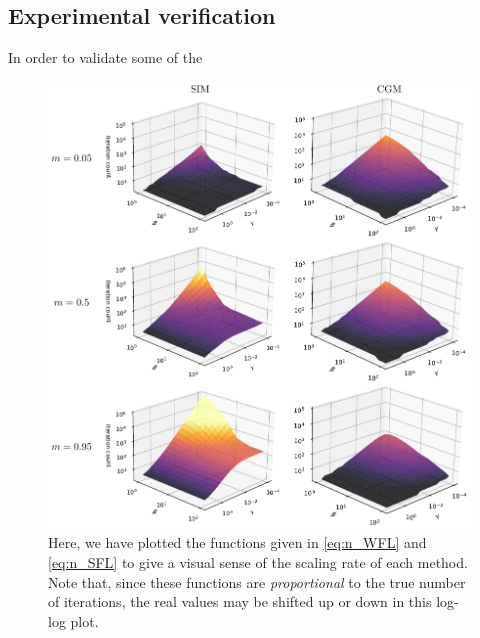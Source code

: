 \subsection{Experimental verification}

In order to validate some of the 

\begin{figure}[hb]
    \begin{center} 
    \includegraphics[width=\linewidth]{Figures/3d_iterations.pdf}
    \end{center}
    \caption{\small{ Here, we have plotted the functions given in \cref{eq:n_WFL} } and \cref{eq:n_SFL} to give a visual sense of the scaling rate of each method. Note that, since these functions are \textit{proportional} to the true number of iterations, the real values may be shifted up or down in this log-log plot.}
    \label{fig:conv_SIM_CGM_compared}
\end{figure}


